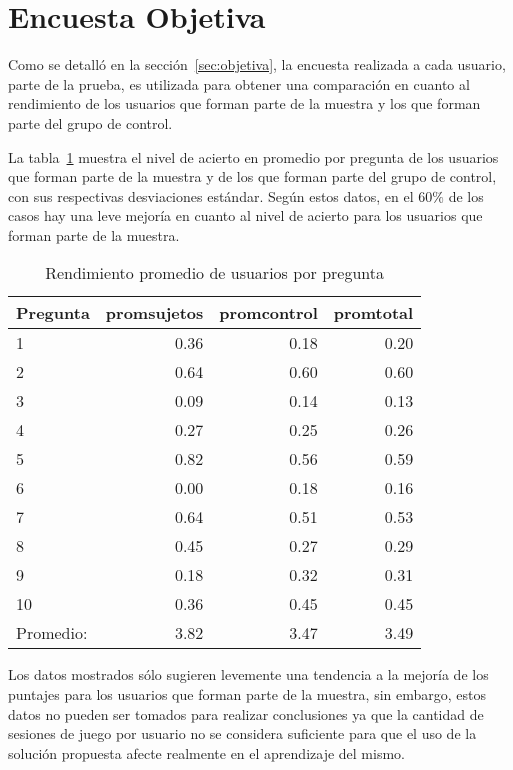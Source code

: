 \section{Encuesta Objetiva}
\label{sec:res_OBJETIVA}


Como se detalló en la sección~\ref{sec:objetiva}, la encuesta realizada a cada
usuario, parte de la prueba, es utilizada para obtener una comparación en
cuanto al rendimiento de los usuarios que forman parte de la muestra y los que
forman parte del grupo de control.

La tabla~\ref{tab:objetiva_rendimiento_por_pregunta} muestra el nivel de acierto
en promedio por pregunta de los usuarios que forman parte de la muestra y de los que
forman parte del grupo de control, con sus respectivas desviaciones estándar. Según
estos datos, en el $60\%$ de los casos hay una leve mejoría en cuanto al nivel de acierto
para los usuarios que forman parte de la muestra.

\begin{table}[!hbt]
\centering
\begin{tabular}{lrrr}
\toprule
\textbf{Pregunta} & 
\textbf{promsujetos} & 
\textbf{promcontrol} & 
\textbf{promtotal} \\ 
\midrule
1         & 0.36 & 0.18 & 0.20 \\
2         & 0.64 & 0.60 & 0.60 \\
3         & 0.09 & 0.14 & 0.13 \\
4         & 0.27 & 0.25 & 0.26 \\
5         & 0.82 & 0.56 & 0.59 \\
6         & 0.00 & 0.18 & 0.16 \\
7         & 0.64 & 0.51 & 0.53 \\
8         & 0.45 & 0.27 & 0.29 \\
9         & 0.18 & 0.32 & 0.31 \\
10        & 0.36 & 0.45 & 0.45 \\
\midrule
Promedio: & 3.82 & 3.47 & 3.49  \\
\bottomrule
\end{tabular}
\caption{Rendimiento promedio de usuarios por pregunta}
\label{tab:objetiva_rendimiento_por_pregunta}
\end{table}

Los datos mostrados sólo sugieren levemente una tendencia a la mejoría de los puntajes 
para los usuarios que forman parte de la muestra, sin embargo, estos datos no pueden ser 
tomados para realizar conclusiones ya que la cantidad de sesiones de juego por usuario no 
se considera suficiente para que el uso de la solución propuesta afecte realmente en el 
aprendizaje del mismo.
